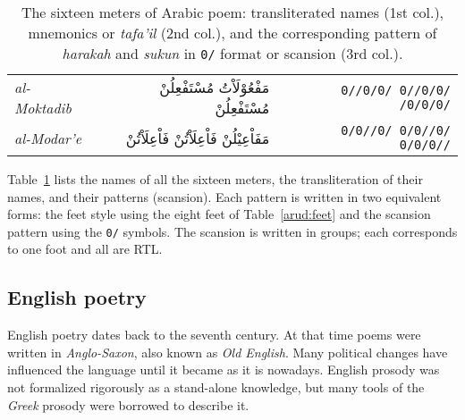 \begin{table}[!tb]
{\begin{tabular}[t!]{lrr}
      \textit{al-Moktadib}  & \textarabic{مَفْعُوْلَاْتُ مُسْتَفْعِلُنْ مُسْتَفْعِلُنْ}     & \texttt{0//0/0/ 0//0/0/ /0/0/0/}\\
      \textit{al-Modar'e}   & \textarabic{مَفَاْعِيْلُنْ فَاْعِلَاْتُنْ فَاْعِلَاْتُنْ}     & \texttt{0/0//0/ 0/0//0/ 0/0/0//}\\
      \bottomrule
    \end{tabular}}
  \caption{The sixteen meters of Arabic poem: transliterated names (1st col.), mnemonics or
    \textit{tafa'il} (2nd col.), and the corresponding pattern of \textit{harakah} and
    \textit{sukun} in \texttt{0/} format or scansion (3rd col.).}\label{arud:meters}
\end{table}

Table~\ref{arud:meters} lists the names of all the sixteen meters, the transliteration of their
names, and their patterns (scansion). Each pattern is written in two equivalent forms: the feet
style using the eight feet of Table~\ref{arud:feet} and the scansion pattern using the \texttt{0/}
symbols. The scansion is written in groups; each corresponds to one foot and all are RTL\@.


\subsection{English poetry}\label{sec:english-poetry}
English poetry dates back to the seventh century. At that time poems were written in
\textit{Anglo-Saxon}, also known as \textit{Old English}. Many political changes have influenced
the language until it became as it is nowadays. English prosody was not formalized rigorously as a
stand-alone knowledge, but many tools of the \textit{Greek} prosody were borrowed to describe it.

